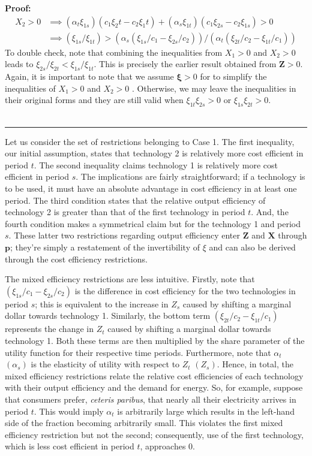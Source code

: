\documentclass[11pt,a4paper,leqno]{extarticle}
\newenvironment{proof}[1][Proof]{\noindent\textbf{#1:} }{\ \rule{0.5em}{0.5em}}
\begin{document}
\begin{proof}
		\begin{align*}
		X_2 > 0 &\implies (\alpha_t \xi_{1s})(c_1 \xi_2t - c_2\xi_1t) + (\alpha_s \xi_{1t})(c_1 \xi_{2s} - c_2 \xi_{1s}) > 0\\
		&\implies (\xi_{1s}/\xi_{1t}) > (\alpha_s (\xi_{1s}/c_1 -  \xi_{2s}/c_2))/(\alpha_t(\xi_{2t}/c_2 - \xi_{1t}/c_1)) 
		\end{align*}
		To double check, note that combining the inequalities from $X_1>0$ and $X_2 > 0$ leads to $\xi_{2s}/\xi_{2t} < \xi_{1s}/\xi_{1t}$. This is precisely the earlier result obtained from $\mathbf{Z} > 0$. Again, it is  important to note that we assume $\boldsymbol{\xi} > 0$ for to simplify the inequalities of $X_1 > 0$ and $X_2 > 0$ . Otherwise, we may leave the inequalities in their original forms and they are still valid when  $\xi_{1t} \xi_{2s} > 0$ or $\xi_{1s} \xi_{2t} > 0$.   \\ \hfill
	\end{proof}
	
	Let us consider the set of restrictions belonging to Case 1. The first inequality, our initial assumption, states that technology 2 is relatively more cost efficient in period $t$. The second inequality claims technology 1 is relatively more cost efficient in period $s$. The implications are fairly straightforward; if a technology is to be used, it must have an absolute advantage in cost efficiency in at least one period. The third condition states that the relative output efficiency of technology 2 is greater than that of the first technology in period $t$. And, the fourth condition makes a symmetrical claim but for the technology 1 and period $s$. These latter two restrictions regarding output efficiency enter $\mathbf{Z}$ and $\mathbf{X}$ through $\mathbf{p}$; they're simply a restatement of the invertibility of $\xi$ and can also be derived through the cost efficiency restrictions. 
	
	The mixed efficiency restrictions are less intuitive. Firstly, note that $\left(\xi_{1s}/c_1 - \xi_{2s}/c_2\right)$ is the difference in cost efficiency for the two technologies in period $s$; this is equivalent to the increase in $Z_s$ caused by shifting a marginal dollar towards technology 1. Similarly, the bottom term $\left( \xi_{2t}/c_2 - \xi_{1t}/c_1 \right)$ represents the change in $Z_t$ caused by shifting a marginal dollar towards technology 1. Both these terms are then multiplied by the share parameter of the utility function for their respective time periods. Furthermore, note that $\alpha_t$ $(\alpha_s)$ is the elasticity of utility with respect to $Z_t$ $(Z_s)$. Hence, in total, the mixed efficiency restrictions relate the relative cost efficiencies of each technology with their output efficiency and the demand for energy. So, for example, suppose that consumers prefer, \textit{ceteris paribus}, that nearly all their electricity arrives in period $t$. This would imply $\alpha_t$ is arbitrarily large which results in the left-hand side of the fraction becoming arbitrarily small. This violates the first mixed efficiency restriction but not the second; consequently, use of the first technology, which is less cost efficient in period $t$, approaches $0$. 
	
\end{document}
